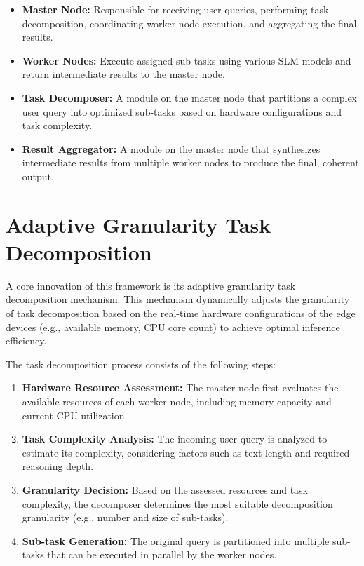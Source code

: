 \begin{itemize}
    \item \textbf{Master Node:} Responsible for receiving user queries, performing task decomposition, coordinating worker node execution, and aggregating the final results.
    \item \textbf{Worker Nodes:} Execute assigned sub-tasks using various SLM models and return intermediate results to the master node.
    \item \textbf{Task Decomposer:} A module on the master node that partitions a complex user query into optimized sub-tasks based on hardware configurations and task complexity.
    \item \textbf{Result Aggregator:} A module on the master node that synthesizes intermediate results from multiple worker nodes to produce the final, coherent output.
\end{itemize}

\section{Adaptive Granularity Task Decomposition}

A core innovation of this framework is its adaptive granularity task decomposition mechanism. This mechanism dynamically adjusts the granularity of task decomposition based on the real-time hardware configurations of the edge devices (e.g., available memory, CPU core count) to achieve optimal inference efficiency.

The task decomposition process consists of the following steps:

\begin{enumerate}
    \item \textbf{Hardware Resource Assessment:} The master node first evaluates the available resources of each worker node, including memory capacity and current CPU utilization.
    \item \textbf{Task Complexity Analysis:} The incoming user query is analyzed to estimate its complexity, considering factors such as text length and required reasoning depth.
    \item \textbf{Granularity Decision:} Based on the assessed resources and task complexity, the decomposer determines the most suitable decomposition granularity (e.g., number and size of sub-tasks).
    \item \textbf{Sub-task Generation:} The original query is partitioned into multiple sub-tasks that can be executed in parallel by the worker nodes.
\end{enumerate}

